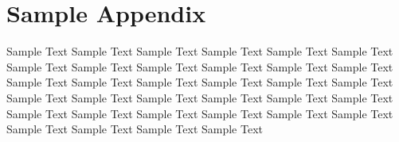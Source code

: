
\section{Sample Appendix}
Sample Text Sample Text Sample Text Sample Text Sample Text Sample Text Sample Text Sample Text Sample Text Sample Text Sample Text Sample Text Sample Text Sample Text Sample Text Sample Text Sample Text 
\clearpage
\noindent
Sample Text Sample Text Sample Text Sample Text Sample Text Sample Text Sample Text Sample Text Sample Text Sample Text Sample Text Sample Text Sample Text Sample Text Sample Text Sample Text Sample Text 

